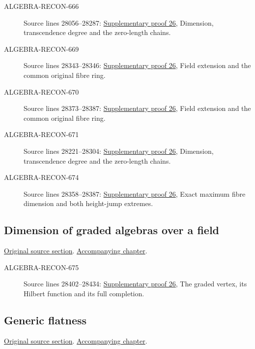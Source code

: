 \begin{description}
\item[ALGEBRA-RECON-666] Source lines 28056--28287: \hyperlink{algebra_noether_dimension_notes_20260928}{Supplementary proof 26}, Dimension, transcendence degree and the zero-length chains.
\item[ALGEBRA-RECON-669] Source lines 28343--28346: \hyperlink{algebra_noether_dimension_notes_20260928}{Supplementary proof 26}, Field extension and the common original fibre ring.
\item[ALGEBRA-RECON-670] Source lines 28373--28387: \hyperlink{algebra_noether_dimension_notes_20260928}{Supplementary proof 26}, Field extension and the common original fibre ring.
\item[ALGEBRA-RECON-671] Source lines 28221--28304: \hyperlink{algebra_noether_dimension_notes_20260928}{Supplementary proof 26}, Dimension, transcendence degree and the zero-length chains.
\item[ALGEBRA-RECON-674] Source lines 28358--28387: \hyperlink{algebra_noether_dimension_notes_20260928}{Supplementary proof 26}, Exact maximum fibre dimension and both height-jump extremes.
\end{description}

\subsection{Dimension of graded algebras over a field}
\hypertarget{algebra-source-section-dimension-graded}{}
\noindent\href{https://github.com/stacks/stacks-project/blob/a04446e57ec1fbc252a871afcec7752fb2807b14/algebra.tex\#L28395}{Original source section}. \href{algebra.pdf\#nameddest=section-dimension-graded}{Accompanying chapter}.

\begin{description}
\item[ALGEBRA-RECON-675] Source lines 28402--28434: \hyperlink{algebra_noether_dimension_notes_20260928}{Supplementary proof 26}, The graded vertex, its Hilbert function and its full completion.
\end{description}

\subsection{Generic flatness}
\hypertarget{algebra-source-section-generic-flatness}{}
\noindent\href{https://github.com/stacks/stacks-project/blob/a04446e57ec1fbc252a871afcec7752fb2807b14/algebra.tex\#L28448}{Original source section}. \href{algebra.pdf\#nameddest=section-generic-flatness}{Accompanying chapter}.

